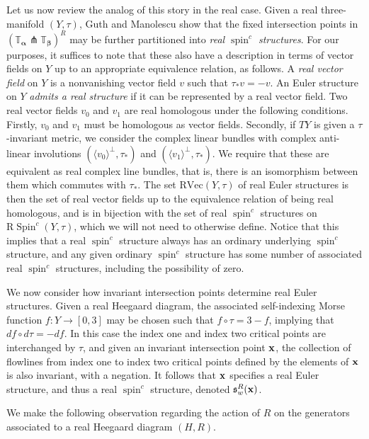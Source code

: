 \documentclass[11pt,reqno]{amsart}
\theoremstyle{definition}
\theoremstyle{remark}
\newcommand{\T}{\mathbb{T}}
\DeclareMathOperator{\spin}{{spin}}
\DeclareMathOperator{\Spin}{{Spin}}
\newcommand{\alphas}{\boldsymbol \alpha}
\newcommand{\betas}{\boldsymbol \beta}
\numberwithin{equation}{section}
\newcommand\co{\colon}
\begin{document}
Let us now review the analog of this story in the real case. Given a real three-manifold $(Y, \tau)$, Guth and Manolescu show that the fixed intersection points in $(\T_{\alphas} \pitchfork \T_{\betas})^R$ may be further partitioned into \emph{real $\spin^c$ structures}. For our purposes, it suffices to note that these also have a description in terms of vector fields on $Y$ up to an appropriate equivalence relation, as follows. A \emph{real vector field} on $Y$ is a nonvanishing vector field $v$ such that $\tau_* v = -v$. An Euler structure on $Y$ \emph{admits a real structure} if it can be represented by a real vector field. Two real vector fields $v_0$ and $v_1$ are real homologous under the following conditions. Firstly, $v_0$ and $v_1$ must be homologous as vector fields. Secondly, if $TY$ is given a $\tau$-invariant metric, we consider the complex linear bundles with complex anti-linear involutions $(\langle v_0 \rangle^{\perp}, \tau_*)$ and $(\langle v_1 \rangle^{\perp}, \tau_*)$. We require that these are equivalent as real complex line bundles, that is, there is an isomorphism between them which commutes with $\tau_*$. The set $\mathrm{RVec}(Y, \tau)$ of real Euler structures is then the set of real vector fields up to the equivalence relation of being real homologous, and is in bijection with the set of real $\spin^c$ structures on $\mathrm{R}\Spin^c(Y, \tau)$, which we will not need to otherwise define. Notice that this implies that a real $\spin^c$ structure always has an ordinary underlying $\spin^c$ structure, and any given ordinary $\spin^c$ structure has some number of associated real $\spin^c$ structures, including the possibility of zero.

We now consider how invariant intersection points determine real Euler structures. Given a real Heegaard diagram, the associated self-indexing Morse function $f \co Y \rightarrow [0,3]$ may be chosen such that $f \circ \tau = 3-f$, implying that $df \circ d\tau = -df$. In this case the index one and index two critical points are interchanged by $\tau$, and given an invariant intersection point ${\bf x}$, the collection of flowlines from index one to index two critical points defined by the elements of ${\bf x}$ is also invariant, with a negation. It follows that ${\bf x}$ specifies a real Euler structure, and thus a real $\spin^c$ structure, denoted $\mathfrak s^R_{w}({\bf x})$. 


We make the following observation regarding the action of $R$ on the generators associated to a real Heegaard diagram $(H,R)$. 
\end{document}
